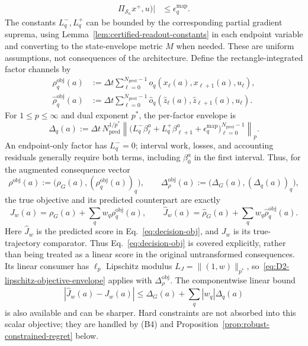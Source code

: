 \begin{corollary}
\begin{align}
                           \Pi_{\mathcal S_\kappa}x^+,u)|
 &\le\epsilon_q^{\mathrm{map}}.\label{eq:D2-factor-map-error}
\end{align}
The constants $L_q^-,L_q^+$ can be bounded by the corresponding partial
gradient suprema, using Lemma~\ref{lem:certified-readout-constants} in each
endpoint variable and converting to the state-envelope metric $M$ when
needed. These are uniform assumptions, not consequences of the architecture.
Define the rectangle-integrated factor channels by
\begin{align}
  \rho_q^{\mathrm{obj}}(a)
  &:=\Delta t\sum_{\ell=0}^{{N_{\mathrm{pred}}}-1}
       o_q(x_\ell(a),x_{\ell+1}(a),u_\ell),
  \\
  \hat\rho_q^{\mathrm{obj}}(a)
  &:=\Delta t\sum_{\ell=0}^{{N_{\mathrm{pred}}}-1}
       \hat o_q(\hat z_\ell(a),\hat z_{\ell+1}(a),u_\ell).
\end{align}
For $1\le p\le\infty$ and dual exponent $p^\ast$, the per-factor envelope is
\begin{equation}
  \Delta_q(a):=
  \Delta t\,N_{\mathrm{pred}}^{1/p^\ast}
  \left\|
    \bigl(L_q^-\beta_\ell^a+L_q^+\beta_{\ell+1}^a
          +\epsilon_q^{\mathrm{map}}\bigr)
    _{\ell=0}^{{N_{\mathrm{pred}}}-1}
  \right\|_p.
  \label{eq:D2-factor-channel-envelope}
\end{equation}
An endpoint-only factor has $L_q^-=0$; interval work, losses, and accounting
residuals generally require both terms, including $\beta_0^a$ in the first
interval.
Thus, for the augmented consequence vector
\[
  \rho^{\mathrm{obj}}(a)
  :=\bigl(\rho_G(a),(\rho_q^{\mathrm{obj}}(a))_q\bigr),
  \qquad
  \Delta_\rho^{\mathrm{obj}}(a)
  :=\bigl(\Delta_G(a),(\Delta_q(a))_q\bigr),
\]
the true objective and its predicted counterpart are exactly
\begin{equation}
  J_w(a)=\rho_G(a)+\sum_q w_q\rho_q^{\mathrm{obj}}(a),
  \qquad
  \hat J_w(a)=\hat\rho_G(a)+\sum_q w_q\hat\rho_q^{\mathrm{obj}}(a).
  \label{eq:D2-full-objective-channelized}
\end{equation}
Here $\hat J_w$ is the predicted score in Eq.~\eqref{eq:decision-obj}, and
$J_w$ is its true-trajectory comparator.
Thus Eq.~\eqref{eq:decision-obj} is covered explicitly, rather
than being treated as a linear score in the original untransformed
consequences.  Its
linear consumer has $\ell_p$ Lipschitz modulus
$L_J=\|(1,w)\|_{p^\ast}$, so~\eqref{eq:D2-lipschitz-objective-envelope}
applies with $\Delta_\rho^{\mathrm{obj}}$.  The componentwise linear bound
\begin{equation}
  |\hat J_w(a)-J_w(a)|
  \leq\Delta_G(a)+\sum_q|w_q|\Delta_q(a)
  \label{eq:D2-full-objective-linear-envelope}
\end{equation}
is also available and can be sharper.  Hard constraints are not absorbed into
this scalar objective; they are handled by (B4) and
Proposition~\ref{prop:robust-constrained-regret} below.
\end{corollary}

